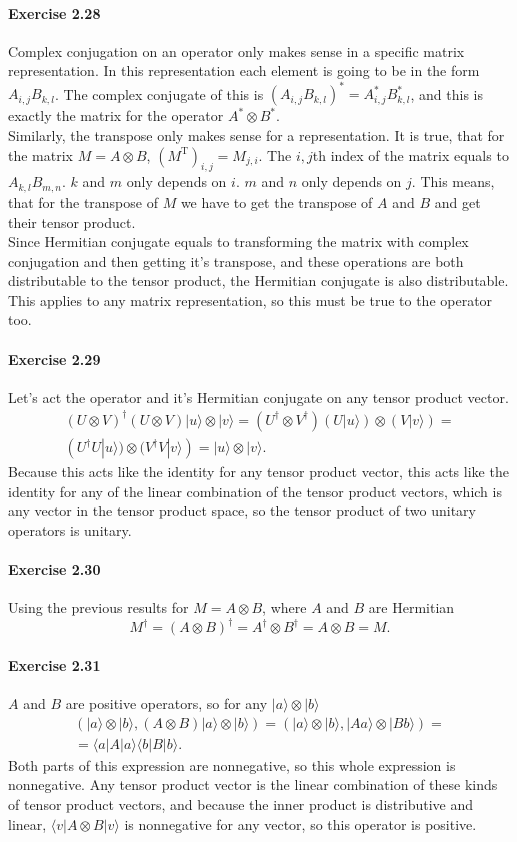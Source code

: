 \documentclass[a4paper,12pt]{article}
\newcommand{\exercise}[1]{\paragraph{Exercise #1}}
\newcommand{\la}{\langle}
\newcommand{\ra}{\rangle}
\begin{document}
    \exercise{2.28} Complex conjugation on an operator only makes sense in a specific matrix representation. In this representation each element is going to be in the form $A_{i, j} B_{k, l}$. The complex conjugate of this is $(A_{i, j} B_{k, l})^* = A_{i, j}^* B_{k, l}^*$, and this is exactly the matrix for the operator $A^* \otimes B^*$. \\
    \indent
    Similarly, the transpose only makes sense for a representation. It is true, that for the matrix $M = A \otimes B$, $(M^\textrm{T})_{i, j} = M_{j, i}$. The $i, j$th index of the matrix equals to $A_{k, l} B_{m, n}$. $k$ and $m$ only depends on $i$. $m$ and $n$ only depends on $j$. This means, that for the transpose of $M$ we have to get the transpose of $A$ and $B$ and get their tensor product. \\
    \indent
    Since Hermitian conjugate equals to transforming the matrix with complex conjugation and then getting it's transpose, and these operations are both distributable to the tensor product, the Hermitian conjugate is also distributable. This applies to any matrix representation, so this must be true to the operator too.

    \exercise{2.29} Let's act the operator and it's Hermitian conjugate on any tensor product vector.
    \begin{gather}
        \nonumber
        (U \otimes V)^\dagger (U \otimes V) | u \ra \otimes | v \ra =
        (U^\dagger \otimes V^\dagger) (U| u \ra) \otimes (V| v \ra) = \\
        (U^\dagger U| u \ra) \otimes (V^\dagger V| v \ra) = | u \ra \otimes | v \ra \textrm{.}
    \end{gather}
    Because this acts like the identity for any tensor product vector, this acts like the identity for any of the linear combination of the tensor product vectors, which is any vector in the tensor product space, so the tensor product of two unitary operators is unitary.

    \exercise{2.30} Using the previous results for $M = A \otimes B$, where $A$ and $B$ are Hermitian
    \begin{equation}
        M^\dagger = (A \otimes B)^\dagger = A^\dagger \otimes B^\dagger = A \otimes B = M \textrm{.}
    \end{equation}

    \exercise{2.31} $A$ and $B$ are positive operators, so for any $| a \ra \otimes | b \ra$
    \begin{gather}
        \nonumber
        (| a \ra \otimes | b \ra, (A \otimes B) | a \ra \otimes | b \ra) = (| a \ra \otimes | b \ra, | A a \ra \otimes | B b \ra) = \\
        = \la a | A | a \ra \la b | B | b \ra \textrm{.}
    \end{gather}
    Both parts of this expression are nonnegative, so this whole expression is nonnegative. Any tensor product vector is the linear combination of these kinds of tensor product vectors, and because the inner product is distributive and linear, $\la v | A \otimes B | v \ra$ is nonnegative for any vector, so this operator is positive.
\end{document}
